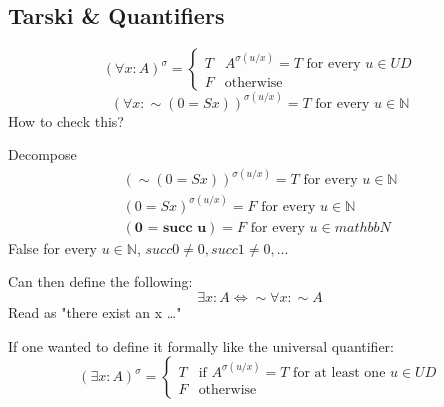 \documentclass[11pt]{article}
\begin{document}
\subsection{Tarski \& Quantifiers}
\label{sec:orgf8f35a4}
\begin{equation*}
  (\forall x: A)^{\sigma} =
  \begin{cases}
    T & A^{\sigma(u/x)}=T \text{ for every }
    u \in UD
    \\ F & \text{otherwise}
  \end{cases}
\end{equation*}
\begin{equation*}
  (\forall x:\sim (0=Sx))^{\sigma (u/x)} = T \text{ for every }u \in \mathbb{N}
\end{equation*}
How to check this?

Decompose
\begin{align*}
  (\sim (0=Sx))^{\sigma (u/x)} = T \text{ for every }u \in \mathbb{N}
  \\ (0=Sx)^{\sigma (u/x)} = F \text{ for every }u \in \mathbb{N}
  \\ (\textbf{0 = succ u}) = F \text{ for every }u \in mathbb{N}
\end{align*}
False for every \(u \in \mathbb{N}\), \(succ 0 \neq 0, succ 1 \neq 0, \ldots\)

Can then define the following:
$$\exists x : A \iff \sim \forall x : \sim A$$
Read as "there exist an x \ldots{}"

If one wanted to define it formally like the universal quantifier:
\begin{equation*}
  (\exists x : A)^{\sigma} =
  \begin{cases}
    T & \text{if } A^{\sigma(u/x)}=T \text{ for at least one }u \in UD
    \\ F & \text{otherwise}
  \end{cases}
\end{equation*}
\end{document}
